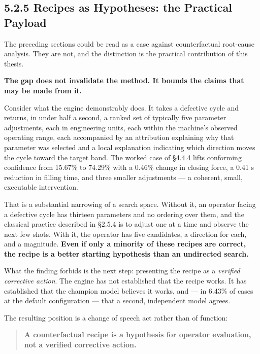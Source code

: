 \hypertarget{recipes-as-hypotheses-the-practical-payload}{%
\subsection{5.2.5 Recipes as Hypotheses: the Practical Payload}\label{recipes-as-hypotheses-the-practical-payload}}

The preceding sections could be read as a case against counterfactual root-cause analysis. They are not, and the distinction is the practical contribution of this thesis.

\textbf{The gap does not invalidate the method. It bounds the claims that may be made from it.}

Consider what the engine demonstrably does. It takes a defective cycle and returns, in under half a second, a ranked set of typically five parameter adjustments, each in engineering units, each within the machine's observed operating range, each accompanied by an attribution explaining why that parameter was selected and a local explanation indicating which direction moves the cycle toward the target band. The worked case of §4.4.4 lifts conforming confidence from 15.67\% to 74.29\% with a 0.46\% change in closing force, a 0.41 s reduction in filling time, and three smaller adjustments --- a coherent, small, executable intervention.

That is a substantial narrowing of a search space. Without it, an operator facing a defective cycle has thirteen parameters and no ordering over them, and the classical practice described in §2.5.4 is to adjust one at a time and observe the next few shots. With it, the operator has five candidates, a direction for each, and a magnitude. \textbf{Even if only a minority of these recipes are correct, the recipe is a better starting hypothesis than an undirected search.}

What the finding forbids is the next step: presenting the recipe as a \emph{verified corrective action}. The engine has not established that the recipe works. It has established that the champion model believes it works, and --- in 6.43\% of cases at the default configuration --- that a second, independent model agrees.

The resulting position is a change of speech act rather than of function:

\begin{quote}
\textbf{A counterfactual recipe is a hypothesis for operator evaluation, not a verified corrective action.}
\end{quote}

